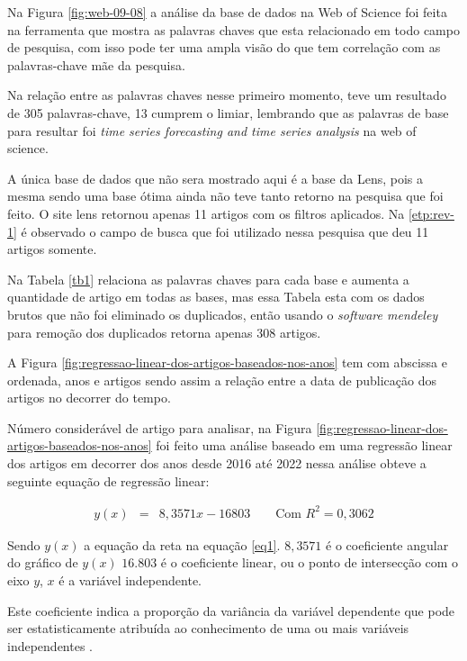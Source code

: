 


Na Figura \ref{fig:web-09-08} a análise da base de dados na Web of Science foi feita na ferramenta que mostra as palavras chaves que esta relacionado em todo campo de pesquisa, com isso pode ter uma ampla visão do que tem correlação com as palavras-chave mãe da pesquisa.

Na relação entre as palavras chaves nesse primeiro momento, teve um resultado de 305 palavras-chave, 13 cumprem o limiar, lembrando que as palavras de base para resultar foi \textit{time series forecasting and time series analysis } na web of science.


A única base de dados que não sera mostrado aqui é a base da Lens, pois a mesma sendo uma base ótima ainda não teve tanto retorno na pesquisa que foi feito. O site lens retornou apenas 11 artigos com os filtros aplicados. Na \ref{etp:rev-1} é observado o campo de busca que foi utilizado nessa pesquisa que deu 11 artigos somente.





Na Tabela \ref{tb1} relaciona as palavras chaves para cada base e aumenta a quantidade de artigo em todas as bases, mas essa Tabela esta com os dados brutos que não foi eliminado os duplicados, então usando o \textit{software mendeley} para remoção dos duplicados retorna apenas  308 artigos.






A Figura \ref{fig:regressao-linear-dos-artigos-baseados-nos-anos} tem com abscissa e ordenada, anos e artigos sendo assim a relação entre a data de publicação dos artigos no decorrer do tempo.

Número considerável de artigo para analisar, na Figura \ref{fig:regressao-linear-dos-artigos-baseados-nos-anos} foi feito uma análise baseado em uma regressão linear dos artigos em decorrer dos anos desde 2016 até 2022 nessa análise obteve a seguinte equação de regressão linear:

\begin{eqnarray}
	y(x)&=&8,3571x - 16803 \qquad \text{Com } R^2=0,3062\label{eq1}
\end{eqnarray}

Sendo $y(x)$ a equação da reta na equação \eqref{eq1}. $8,3571$ é o coeficiente angular do gráfico de $ y(x) $ $16.803$ é o coeficiente linear, ou o ponto de intersecção com o eixo $y$, $x$ é a variável independente.

Este coeficiente indica a proporção da variância da variável dependente que pode ser estatisticamente atribuída ao conhecimento de uma ou mais variáveis independentes . 

